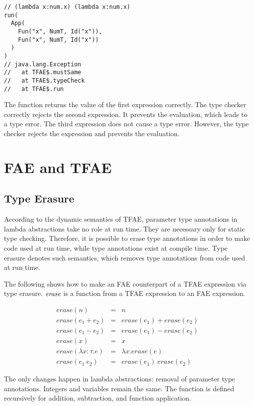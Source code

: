 \begin{verbatim}
// (lambda x:num.x) (lambda x:num.x)
run(
  App(
    Fun("x", NumT, Id("x")),
    Fun("x", NumT, Id("x"))
  )
)
// java.lang.Exception
//   at TFAE$.mustSame
//   at TFAE$.typeCheck
//   at TFAE$.run
\end{verbatim}

The function returns the value of the first expression correctly. The type
checker correctly rejects the second expression. It prevents the evaluation,
which leads to a type error. The third expression does not cause a type error.
However, the type checker rejects the expression and prevents the evaluation.

\section{FAE and TFAE}

\subsection{Type Erasure}

According to the dynamic semantics of TFAE, parameter type annotations in lambda
abstractions take no role at run time. They are necessary only for static type
checking. Therefore, it is possible to erase type annotations in order to make
code used at run time, while type annotations exist at compile time. Type
erasure denotes such semantics, which removes type annotations from code used at
run time.

The following shows how to make an FAE counterpart of a TFAE expression via type
erasure. $\mbox{\emph{erase}}$ is a function from a TFAE expression to an FAE
expression.

\[
\begin{array}{rcl}
\mathit{erase}(n) &=& n \\
\mathit{erase}(e_1+e_2) &=& \mathit{erase}(e_1)+\mathit{erase}(e_2) \\
\mathit{erase}(e_1-e_2) &=& \mathit{erase}(e_1)-\mathit{erase}(e_2) \\
\mathit{erase}(x) &=& x \\
\mathit{erase}(\lambda x:\tau.e) &=& \lambda x.\mathit{erase}(e) \\
\mathit{erase}(e_1\ e_2) &=& \mathit{erase}(e_1)\ \mathit{erase}(e_2)
\end{array}
\]

The only changes happen in lambda abstractions: removal of parameter type
annotations. Integers and variables remain the same. The function is defined
recursively for addition, subtraction, and function application.


